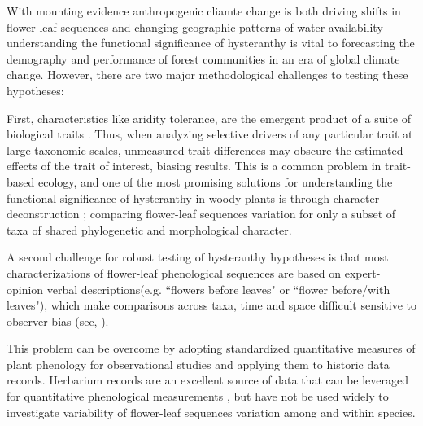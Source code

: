 \documentclass{article}\usepackage[]{graphicx}\usepackage[]{color}
\begin{document}
\noindent With mounting evidence anthropogenic cliamte change is both driving shifts in flower-leaf sequences \citep{Ma2020:aa} and changing geographic patterns of water availability \citep{}  understanding the functional significance of hysteranthy is vital to forecasting the demography and performance of forest communities in an era of global climate change. However, there are two major methodological challenges to testing these hypotheses:

\noindent First, characteristics like aridity tolerance, are the emergent product of a suite of biological traits \citep{Simova:2017vk}. Thus, when analyzing selective drivers of any particular trait at large taxonomic scales, unmeasured trait differences may obscure the estimated effects of the trait of interest, biasing results. %
This is a common problem in trait-based ecology, and one of the most promising solutions for understanding the functional significance of hysteranthy in woody plants is through character deconstruction \citep{Terribile2009}; comparing flower-leaf sequences variation for only a subset of taxa of shared phylogenetic and morphological character.   

\noindent A second challenge for robust testing of hysteranthy hypotheses is that most characterizations of flower-leaf phenological sequences are based on expert-opinion verbal descriptions(e.g. ``flowers before leaves" or ``flower before/with leaves"), which make comparisons across taxa, time and space difficult sensitive to observer bias (see, \citep{Buonaiuto2020}). 

\noindent This problem can be overcome by adopting standardized quantitative measures of plant phenology for observational studies and applying them to historic data records. Herbarium records are an excellent source of data that can be leveraged for quantitative phenological measurements \citep{Willis2017}, but have not be used widely to investigate variability of flower-leaf sequences variation among and within species.
\end{document}
